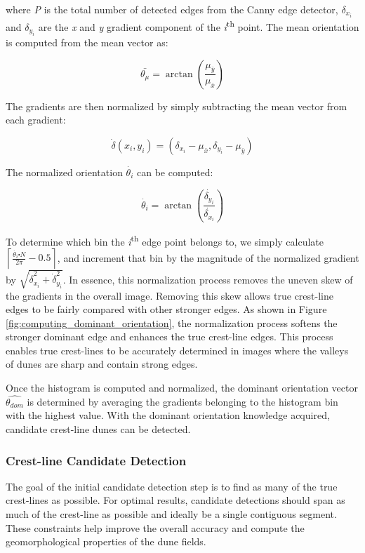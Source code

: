 where \emph{P} is the total number of detected edges from the Canny edge detector, $\delta_{x_{i}}$ and $\delta_{y_{i}}$ are the \emph{x} and \emph{y} gradient component of the \emph{i}\textsuperscript{th} point. The
mean orientation is computed from the mean vector as:

\[
\bar{\theta_{\mu}}=\arctan\left(\frac{\mu_{\bar{y}}}{\mu_{\bar{x}}}\right)
\]

The gradients are then normalized by simply subtracting the mean vector from each gradient:

\[
\dot{\delta}\left(x_{i},y_{i}\right)=\left(\delta_{x_{i}}-\mu_{\bar{x}},\delta_{y_{i}}-\mu_{\bar{y}}\right)
\]

The normalized orientation $\dot{\theta_{i}}$ can be computed:

\[
\dot{\theta_{i}}=\arctan\left(\frac{\dot{\delta_{y_{i}}}}{\dot{\delta_{x_{i}}}}\right)
\]

To determine which bin the \emph{i}\textsuperscript{th}	edge point belongs to, we simply calculate $\left\lceil \frac{\dot{\theta_{i}}\centerdot N}{2\pi}-0.5\right\rceil $,	and increment that bin by the magnitude of the normalized gradient	by $\sqrt{\dot{\delta}_{x_{i}}^{2}+\dot{\delta}_{y_{i}}^{2}}$. In essence, this normalization process removes the uneven skew of the gradients in the overall image. Removing this skew allows true crest-line edges to be fairly compared with other stronger edges. As shown in Figure \ref{fig:computing_dominant_orientation}, the normalization process softens the stronger dominant edge and enhances the true crest-line edges. This process enables true crest-lines to be accurately determined in images where the valleys of dunes are sharp and contain strong edges.

Once the histogram is computed and normalized, the dominant orientation vector $\hat{\theta_{dom}}$ is determined by averaging the gradients belonging to the histogram bin with the highest value. With the dominant orientation knowledge acquired, candidate crest-line dunes can be detected.

\subsubsection{Crest-line Candidate Detection}  

The goal of the initial candidate detection step is to find as many of the true crest-lines as possible. For optimal results, candidate detections should span as much of the crest-line as possible and ideally be a single contiguous segment. These constraints help improve the overall accuracy and compute the geomorphological properties of the dune fields.

